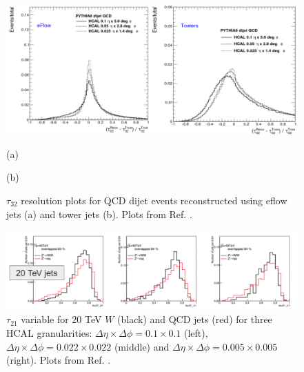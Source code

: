 \begin{figure}
	\centering
	\includegraphics[width=\textwidth]{./Figures/hcal_gran_tau32.png}
	\begin{minipage}[t]{0.5\textwidth}
		\caption*{(a)}
		\label{fig:CompGran_M}
	\end{minipage}%
	\hfill
	\begin{minipage}[t]{0.5\textwidth}
		\caption*{(b)}
	\end{minipage}
	\caption{$\tau_{32}$ resolution plots for QCD dijet events reconstructed using eflow jets (a) and tower jets (b). Plots from Ref. \cite{FCCweek2015}.}
	\label{fig:hcal_gran_tau32}
\end{figure}

\begin{figure}
	\centering
	\includegraphics[width=\textwidth]{./Figures/overlap.png}
	\caption{$\tau_{21}$ variable for $20$ TeV $W$ (black) and QCD jets (red) for three HCAL granularities: $\Delta\eta\times\Delta\phi=0.1\times 0.1$ (left), $\Delta\eta\times\Delta\phi=0.022\times 0.022$ (middle) and $\Delta\eta\times\Delta\phi=0.005\times 0.005$ (right). Plots from Ref. \cite{BOOST2017}.}
	\label{fig:overlap}
\end{figure}

